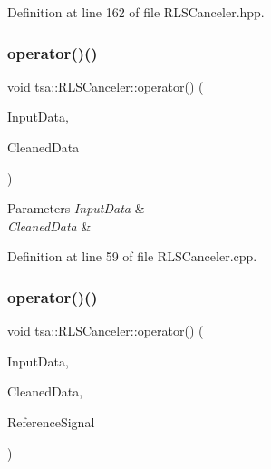 Definition at line 162 of file R\+L\+S\+Canceler.\+hpp.

\mbox{\label{classtsa_1_1_r_l_s_canceler_aa83e2ee91b1e68b54099455dc6e5f3c6}} 
\subsubsection{\texorpdfstring{operator()()}{operator()()}\hspace{0.1cm}{\footnotesize\ttfamily [1/2]}}
{\footnotesize\ttfamily void tsa\+::\+R\+L\+S\+Canceler\+::operator() (\begin{DoxyParamCaption}\item[{\hyperlink{namespacetsa_ac599574bcc094eda25613724b8f3ca9e}{Seq\+View\+Double} \&}]{Input\+Data,  }\item[{\hyperlink{namespacetsa_ac599574bcc094eda25613724b8f3ca9e}{Seq\+View\+Double} \&}]{Cleaned\+Data }\end{DoxyParamCaption})}


\begin{DoxyParams}{Parameters}
{\em Input\+Data} & \\
\hline
{\em Cleaned\+Data} & \\
\hline
\end{DoxyParams}


Definition at line 59 of file R\+L\+S\+Canceler.\+cpp.

\mbox{\label{classtsa_1_1_r_l_s_canceler_a8801aca2920a4cdaca83c41fdc5d7754}} 
\subsubsection{\texorpdfstring{operator()()}{operator()()}\hspace{0.1cm}{\footnotesize\ttfamily [2/2]}}
{\footnotesize\ttfamily void tsa\+::\+R\+L\+S\+Canceler\+::operator() (\begin{DoxyParamCaption}\item[{\hyperlink{namespacetsa_ac599574bcc094eda25613724b8f3ca9e}{Seq\+View\+Double} \&}]{Input\+Data,  }\item[{\hyperlink{namespacetsa_ac599574bcc094eda25613724b8f3ca9e}{Seq\+View\+Double} \&}]{Cleaned\+Data,  }\item[{\hyperlink{namespacetsa_ac599574bcc094eda25613724b8f3ca9e}{Seq\+View\+Double} \&}]{Reference\+Signal }\end{DoxyParamCaption})}


